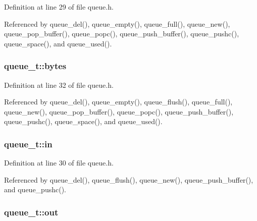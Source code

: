 Definition at line 29 of file queue.\-h.



Referenced by queue\-\_\-del(), queue\-\_\-empty(), queue\-\_\-full(), queue\-\_\-new(), queue\-\_\-pop\-\_\-buffer(), queue\-\_\-popc(), queue\-\_\-push\-\_\-buffer(), queue\-\_\-pushc(), queue\-\_\-space(), and queue\-\_\-used().

\hypertarget{structqueue__t_a58398d4ee60bc90ffba2bc3488fe185b}{
\subsubsection[{bytes}]{ queue\-\_\-t\-::bytes}}\label{structqueue__t_a58398d4ee60bc90ffba2bc3488fe185b}


Definition at line 32 of file queue.\-h.



Referenced by queue\-\_\-del(), queue\-\_\-empty(), queue\-\_\-flush(), queue\-\_\-full(), queue\-\_\-new(), queue\-\_\-pop\-\_\-buffer(), queue\-\_\-popc(), queue\-\_\-push\-\_\-buffer(), queue\-\_\-pushc(), queue\-\_\-space(), and queue\-\_\-used().

\hypertarget{structqueue__t_a7a6832e36c70a1db7fddc93fb6be9d63}{
\subsubsection[{in}]{ queue\-\_\-t\-::in}}\label{structqueue__t_a7a6832e36c70a1db7fddc93fb6be9d63}


Definition at line 30 of file queue.\-h.



Referenced by queue\-\_\-del(), queue\-\_\-flush(), queue\-\_\-new(), queue\-\_\-push\-\_\-buffer(), and queue\-\_\-pushc().

\hypertarget{structqueue__t_a8f6e1c623d2ceed398a71a0aab93b0fa}{
\subsubsection[{out}]{ queue\-\_\-t\-::out}}\label{structqueue__t_a8f6e1c623d2ceed398a71a0aab93b0fa}


